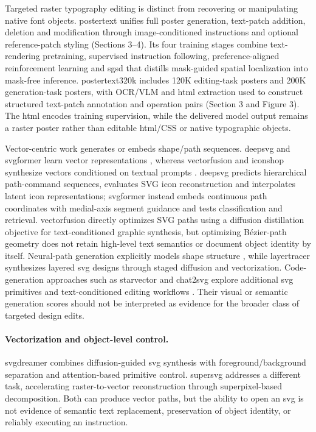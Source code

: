 Targeted raster typography editing is distinct from recovering or manipulating native font objects.
\ac{postertext} unifies full poster generation, text-patch addition, deletion and modification through image-conditioned instructions and optional reference-patch styling (Sections 3--4).
Its four training stages combine text-rendering pretraining, supervised instruction following, preference-aligned reinforcement learning and \ac{sgsd} that distills mask-guided spatial localization into mask-free inference.
\ac{postertext320k} includes 120K editing-task posters and 200K generation-task posters, with OCR/VLM and \ac{html} extraction used to construct structured text-patch annotation and operation pairs (Section 3 and Figure 3).
The \ac{html} encodes training supervision, while the delivered model output remains a raster poster rather than editable \ac{html}/CSS or native typographic objects.

Vector-centric work generates or embeds shape/path sequences.
\ac{deepsvg} and \ac{svgformer} learn vector representations \citep{deepsvg2020,svgformer2023}, whereas \ac{vectorfusion} and \ac{iconshop} synthesize vectors conditioned on textual prompts \citep{vectorfusion2023,iconshop2023}.
\ac{deepsvg} predicts hierarchical path-command sequences, evaluates SVG icon reconstruction and interpolates latent icon representations; \ac{svgformer} instead embeds continuous path coordinates with medial-axis segment guidance and tests classification and retrieval.
\ac{vectorfusion} directly optimizes SVG paths using a diffusion distillation objective for text-conditioned graphic synthesis, but optimizing Bézier-path geometry does not retain high-level text semantics or document object identity by itself.
Neural-path generation explicitly models shape structure \citep{neuralpath2024}, while \ac{layertracer} synthesizes layered \ac{svg} designs through staged diffusion and vectorization.
Code-generation approaches such as \ac{starvector} and \ac{chat2svg} explore additional \ac{svg} primitives and text-conditioned editing workflows \citep{chat2svg2025}.
Their visual or semantic generation scores should not be interpreted as evidence for the broader class of targeted design edits.

\paragraph{Vectorization and object-level control.}
\ac{svgdreamer} combines diffusion-guided \ac{svg} synthesis with foreground/background separation and attention-based primitive control.
\ac{supersvg} addresses a different task, accelerating raster-to-vector reconstruction through superpixel-based decomposition.
Both can produce vector paths, but the ability to open an \ac{svg} is not evidence of semantic text replacement, preservation of object identity, or reliably executing an instruction.

